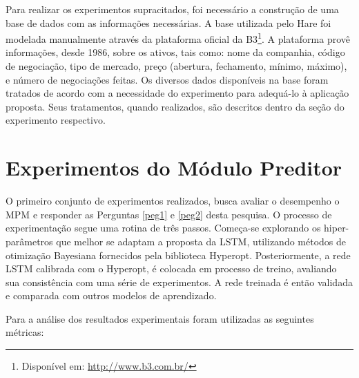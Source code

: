 Para realizar os experimentos supracitados, foi necessário a construção de uma base de dados com as informações necessárias. A base utilizada pelo Hare foi modelada manualmente através da plataforma oficial da B3\footnote{Disponível em: \url{http://www.b3.com.br/}}. A plataforma provê informações, desde 1986, sobre os ativos, tais como: nome da companhia, código de negociação, tipo de mercado, preço (abertura, fechamento, mínimo, máximo), e número de negociações feitas. Os diversos dados disponíveis na base foram tratados de acordo com a necessidade do experimento para adequá-lo à aplicação proposta. Seus tratamentos, quando realizados, são descritos dentro da seção do experimento respectivo.

\section{Experimentos do Módulo Preditor}
\label{exp:mp}

O primeiro conjunto de experimentos realizados, busca avaliar o desempenho o \acrshort{MPM} e responder as Perguntas \ref{peg1} e \ref{peg2} desta pesquisa. O processo de experimentação segue uma rotina de três passos. Começa-se explorando os hiper-parâmetros que melhor se adaptam a proposta da \acrshort{LSTM}, utilizando métodos de otimização Bayesiana fornecidos pela biblioteca Hyperopt. Posteriormente, a rede \acrshort{LSTM} calibrada com o Hyperopt, é colocada em processo de treino, avaliando sua consistência com uma série de experimentos. A rede treinada é então validada e comparada com outros modelos de aprendizado.


Para a análise dos resultados experimentais foram utilizadas as seguintes métricas: 






